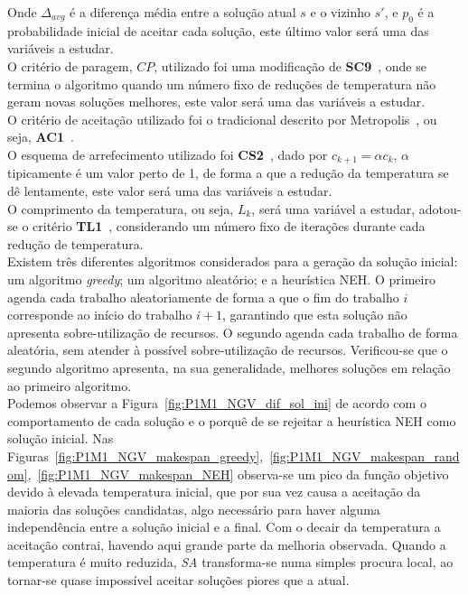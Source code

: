 Onde $\Delta_{avg}$ é a diferença média entre a solução atual $s$ e o vizinho $s'$, e $p_{0}$ é a probabilidade inicial de aceitar cada solução, este último valor será uma das variáveis a estudar.\\
O critério de paragem, $CP$, utilizado foi uma modificação de \textbf{SC9}~\cite{franzinRevisitingSimulatedAnnealing2019}, onde se termina o algoritmo quando um número fixo de reduções de temperatura não geram novas soluções melhores, este valor será uma das variáveis a estudar.\\
O critério de aceitação utilizado foi o tradicional descrito por Metropolis~\cite{metropolisEquationStateCalculations1953}, ou seja, \textbf{AC1}~\cite{franzinRevisitingSimulatedAnnealing2019}.\\
O esquema de arrefecimento utilizado foi \textbf{CS2}~\cite{franzinRevisitingSimulatedAnnealing2019}, dado por $c_{k+1}=\alpha c_{k}$, $\alpha$ tipicamente é um valor perto de 1, de forma a que a redução da temperatura se dê lentamente, este valor será uma das variáveis a estudar.\\
O comprimento da temperatura, ou seja, $L_{k}$, será uma variável a estudar, adotou-se o critério \textbf{TL1}~\cite{franzinRevisitingSimulatedAnnealing2019}, considerando um número fixo de iterações durante cada redução de temperatura.\\

Existem três diferentes algoritmos considerados para a geração da solução inicial: um algoritmo \textit{greedy}; um algoritmo aleatório; e a heurística NEH. O primeiro agenda cada trabalho aleatoriamente de forma a que o fim do trabalho $i$ corresponde ao início do trabalho $i+1$, garantindo que esta solução não apresenta sobre-utilização de recursos. O segundo agenda cada trabalho de forma aleatória, sem atender à possível sobre-utilização de recursos. Verificou-se que o segundo algoritmo apresenta, na sua generalidade, melhores soluções em relação ao primeiro algoritmo.\\

Podemos observar a Figura~\ref{fig:P1M1_NGV_dif_sol_ini} de acordo com o comportamento de cada solução e o porquê de se rejeitar a heurística NEH como solução inicial. Nas Figuras~\ref{fig:P1M1_NGV_makespan_greedy},~\ref{fig:P1M1_NGV_makespan_random},~\ref{fig:P1M1_NGV_makespan_NEH} observa-se um pico da função objetivo devido à elevada temperatura inicial, que por sua vez causa a aceitação da maioria das soluções candidatas, algo necessário para haver alguma independência entre a solução inicial e a final. Com o decair da temperatura a aceitação contrai, havendo aqui grande parte da melhoria observada. Quando a temperatura é muito reduzida, \textit{SA} transforma-se numa simples procura local, ao tornar-se quase impossível aceitar soluções piores que a atual.\\

